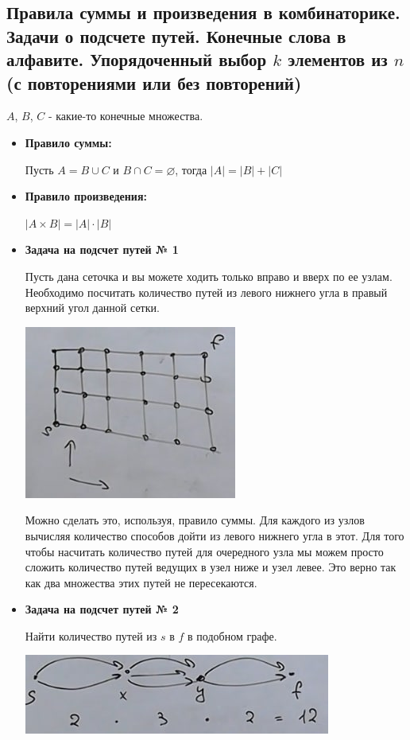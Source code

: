 \subsection{Правила суммы и произведения в комбинаторике. Задачи о подсчете путей. Конечные слова в алфавите. Упорядоченный выбор $k$ элементов из $n$ (с повторениями или без повторений)}

$A$, $B$, $C$ - какие-то конечные множества.
\begin{itemize}
\item \textbf{Правило суммы:}

Пусть $A = B \cup C$ и $B \cap C = \varnothing$, тогда $|A| = |B| + |C|$

\item \textbf{Правило произведения:}

$|A \times B| = |A| \cdot |B|$

\item \textbf{Задача на подсчет путей № 1}

Пусть дана сеточка и вы можете ходить только вправо и вверх по ее узлам. Необходимо посчитать количество путей из левого нижнего угла в правый верхний угол данной сетки.

\includegraphics[scale=1.5]{definitions/images/first-patch.jpg}

Можно сделать это, используя, правило суммы. Для каждого из узлов вычисляя количество способов дойти из левого нижнего угла в этот. Для того чтобы насчитать количество путей для очередного узла мы можем просто сложить количество путей ведущих в узел ниже и узел левее. Это верно так как два множества этих путей не пересекаются.

\item \textbf{Задача на подсчет путей № 2}

Найти количество путей из $s$ в $f$ в подобном графе.

\includegraphics[scale=1.5]{definitions/images/second-patch.jpg}


\end{itemize}

